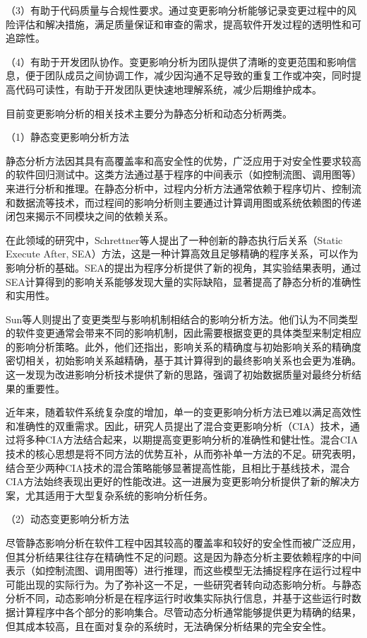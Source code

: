 （3）有助于代码质量与合规性要求。通过变更影响分析能够记录变更过程中的风险评估和解决措施，满足质量保证和审查的需求，提高软件开发过程的透明性和可追踪性。

（4）有助于开发团队协作。变更影响分析为团队提供了清晰的变更范围和影响信息，便于团队成员之间协调工作，减少因沟通不足导致的重复工作或冲突，同时提高代码可读性，有助于开发团队更快速地理解系统，减少后期维护成本。

目前变更影响分析的相关技术主要分为静态分析和动态分析两类。

（1）静态变更影响分析方法

静态分析方法因其具有高覆盖率和高安全性的优势，广泛应用于对安全性要求较高的软件回归测试中。这类方法通过基于程序的中间表示（如控制流图、调用图等）来进行分析和推理。在静态分析中，过程内分析方法通常依赖于程序切片、控制流和数据流等技术\cite{2004Efficient,1991Using}，而过程间的影响分析则主要通过计算调用图或系统依赖图的传递闭包来揭示不同模块之间的依赖关系\cite{JitenderKumarChhabra2018Improved, 2011An, 2013Analyzing}。

在此领域的研究中，Schrettner等人\cite{Department2013Impact}提出了一种创新的静态执行后关系（Static Execute After, SEA）方法，这是一种计算高效且足够精确的程序关系，可以作为影响分析的基础。SEA的提出为程序分析提供了新的视角，其实验结果表明，通过SEA计算得到的影响关系能够发现大量的实际缺陷，显著提高了静态分析的准确性和实用性。

Sun等人\cite{5676283}则提出了变更类型与影响机制相结合的影响分析方法。他们认为不同类型的软件变更通常会带来不同的影响机制，因此需要根据变更的具体类型来制定相应的影响分析策略。此外，他们还指出，影响关系的精确度与初始影响关系的精确度密切相关，初始影响关系越精确，基于其计算得到的最终影响关系也会更为准确。这一发现为改进影响分析技术提供了新的思路，强调了初始数据质量对最终分析结果的重要性。

近年来，随着软件系统复杂度的增加，单一的变更影响分析方法已难以满足高效性和准确性的双重需求。因此，研究人员提出了混合变更影响分析（CIA）技术，通过将多种CIA方法结合起来，以期提高变更影响分析的准确性和健壮性\cite{2021Improving}。混合CIA技术的核心思想是将不同方法的优势互补，从而弥补单一方法的不足。研究表明，结合至少两种CIA技术的混合策略能够显著提高性能，且相比于基线技术，混合CIA方法始终表现出更好的性能改进。这一进展为变更影响分析提供了新的解决方案，尤其适用于大型复杂系统的影响分析任务。

（2）动态变更影响分析方法

尽管静态影响分析在软件工程中因其较高的覆盖率和较好的安全性而被广泛应用，但其分析结果往往存在精确性不足的问题。这是因为静态分析主要依赖程序的中间表示（如控制流图、调用图等）进行推理，而这些模型无法捕捉程序在运行过程中可能出现的实际行为。为了弥补这一不足，一些研究者转向动态影响分析。与静态分析不同，动态影响分析是在程序运行时收集实际执行信息，并基于这些运行时数据计算程序中各个部分的影响集合。尽管动态分析通常能够提供更为精确的结果，但其成本较高，且在面对复杂的系统时，无法确保分析结果的完全安全性。

